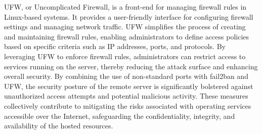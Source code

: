 \documentclass[12pt]{article} %
\begin{document}
\newline
\newline
\noindent UFW, or Uncomplicated Firewall, is a front-end for managing firewall rules in Linux-based systems. It provides a user-friendly interface for configuring firewall settings and managing network traffic. UFW simplifies the process of creating and maintaining firewall rules, enabling administrators to define access policies based on specific criteria such as IP addresses, ports, and protocols. By leveraging UFW to enforce firewall rules, administrators can restrict access to services running on the server, thereby reducing the attack surface and enhancing overall security.
\newline
\newline
\noindent By combining the use of non-standard ports with fail2ban and UFW, the security posture of the remote server is significantly bolstered against unauthorized access attempts and potential malicious activity. These measures collectively contribute to mitigating the risks associated with operating services accessible over the Internet, safeguarding the confidentiality, integrity, and availability of the hosted resources.
\end{document}
